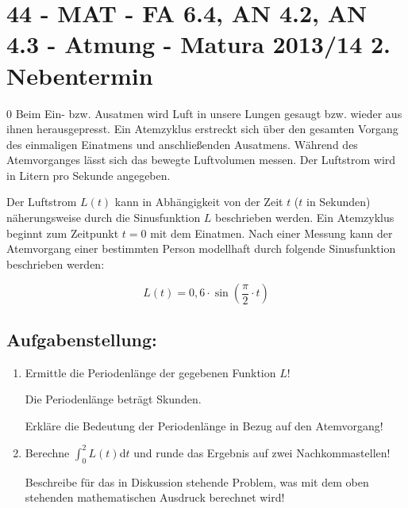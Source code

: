 \section{44 - MAT - FA 6.4, AN 4.2, AN 4.3 - Atmung - Matura 2013/14 2. Nebentermin}

\begin{langesbeispiel} \item[0] %
				 Beim Ein- bzw. Ausatmen wird Luft in unsere Lungen gesaugt bzw. wieder aus ihnen herausgepresst. Ein Atemzyklus erstreckt sich über den gesamten Vorgang des einmaligen Einatmens und anschließenden Ausatmens. Während des Atemvorganges lässt sich das bewegte Luftvolumen messen. Der Luftstrom wird in Litern pro Sekunde angegeben. 
				
				Der Luftstrom $L(t)$ kann in Abhängigkeit von der Zeit $t$ ($t$ in Sekunden) näherungsweise durch die Sinusfunktion $L$ beschrieben werden. Ein Atemzyklus beginnt zum Zeitpunkt $t = 0$ mit dem Einatmen. Nach einer Messung kann der Atemvorgang einer bestimmten Person modellhaft durch folgende Sinusfunktion beschrieben werden: 
				
				$$L(t)=0,6\cdot\sin\left(\frac{\pi}{2}\cdot t\right)$$
	
\subsection{Aufgabenstellung:}
\begin{enumerate}
	\item Ermittle die Periodenlänge der gegebenen Funktion $L$!
	
	Die Periodenlänge beträgt  Skunden.
	
	Erkläre die Bedeutung der Periodenlänge in Bezug auf den Atemvorgang!

\item {} Berechne $\int^2_0{L(t)}$d$t$ und runde das Ergebnis auf zwei Nachkommastellen!

Beschreibe für das in Diskussion stehende Problem, was mit dem oben stehenden mathematischen Ausdruck berechnet wird!
						\end{enumerate}\leer
				
\end{langesbeispiel}
